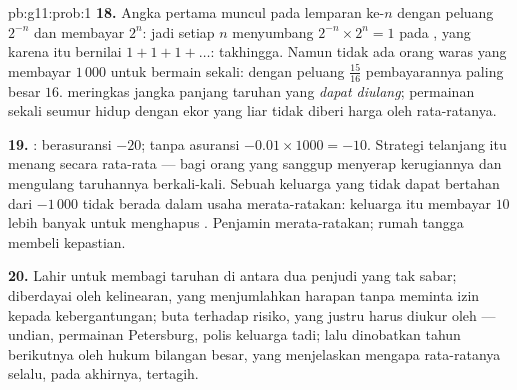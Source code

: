\begin{solution}{pb:g11:prob:1}
\textbf{18.} Angka pertama muncul pada lemparan ke-$n$ dengan peluang
$2^{-n}$ dan membayar $2^n$: jadi setiap $n$ menyumbang
$2^{-n} \times 2^n = 1$ pada , yang karena itu bernilai
$1 + 1 + 1 + \dots$: takhingga. Namun tidak ada orang waras yang membayar
$1\,000$ untuk bermain sekali: dengan peluang $\frac{15}{16}$
pembayarannya paling besar $16$.  meringkas jangka panjang
taruhan yang \emph{dapat diulang}; permainan sekali seumur hidup dengan ekor
yang liar tidak diberi harga oleh rata-ratanya.

\textbf{19.} : berasuransi $-20$; tanpa asuransi
$-0.01 \times 1000 = -10$. Strategi telanjang itu menang secara rata-rata
--- bagi orang yang sanggup menyerap kerugiannya dan mengulang taruhannya
berkali-kali. Sebuah keluarga yang tidak dapat bertahan dari $-1\,000$ tidak
berada dalam usaha merata-ratakan: keluarga itu membayar $10$ lebih banyak
untuk menghapus . Penjamin merata-ratakan; rumah tangga membeli kepastian.

\textbf{20.} Lahir untuk membagi taruhan di antara dua penjudi
yang tak sabar; diberdayai oleh kelinearan, yang menjumlahkan harapan tanpa
meminta izin kepada kebergantungan; buta terhadap risiko, yang justru harus
diukur oleh  --- undian, permainan Petersburg, polis keluarga tadi;
lalu dinobatkan tahun berikutnya oleh hukum bilangan besar, yang menjelaskan
mengapa rata-ratanya selalu, pada akhirnya, tertagih.

\end{solution}
